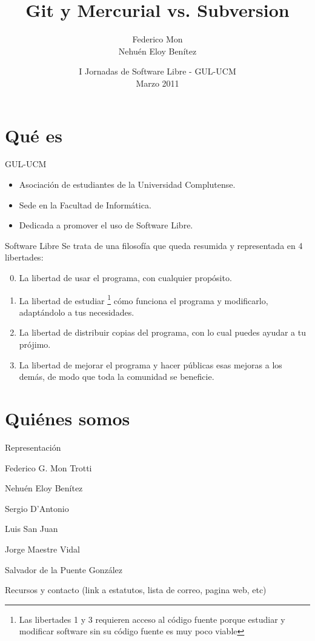 \documentclass[spanish]{beamer}
\title[Git y Mercurial vs. SVN - GUL-UCM]
{Git y Mercurial vs. Subversion
}
\author[\url{http://gulucm.org}]
{
Federico Mon \\
Nehuén Eloy Benítez
}
\institute{Facultad de Informática.\\Universidad Complutense de Madrid.}
\date{
I Jornadas de Software Libre - GUL-UCM\\
Marzo 2011}
\begin{document}
\frame{\titlepage}
\section{Qué es}
\begin{frame}{GUL-UCM}
\begin{itemize}
\item Asociación de estudiantes de la Universidad Complutense.
\item Sede en la Facultad de Informática.
\item Dedicada a promover el uso de Software Libre.
\end{itemize}
\end{frame}
\begin{frame}{Software Libre}
Se trata de una filosofía que queda resumida y representada en 4 libertades:
\begin{enumerate}
\setcounter{enumi}{-1}
\item La libertad de usar el programa, con cualquier propósito.
\item La libertad de estudiar \footnote{Las libertades 1 y 3 requieren acceso
al código fuente porque estudiar y modificar software sin su código fuente es
muy poco viable} cómo funciona el programa y modificarlo, adaptándolo a tus
necesidades.
\item La libertad de distribuir copias del programa, con lo cual puedes ayudar
a tu prójimo.
\item La libertad de mejorar el programa y hacer públicas esas mejoras a los
demás, de modo que toda la comunidad se beneficie.
\end{enumerate}
\end{frame}

\section{Quiénes somos}
\begin{frame}{Representación}
\begin{description}[Left]
\item [Presidente:] Federico G. Mon Trotti
\item [Vicepresidente:] Nehuén Eloy Benítez
\item [Secretario:] Sergio D'Antonio
\item [Tesorero:] Luis San Juan
\item [Vocal de representación estudiantil:] Jorge Maestre Vidal
\item [Vocal de actividades:] Salvador de la Puente González
\end{description}
\end{frame}
\begin{frame}{Recursos y contacto}
(link a estatutos, lista de correo, pagina web, etc)
\end{frame}
\end{document}
